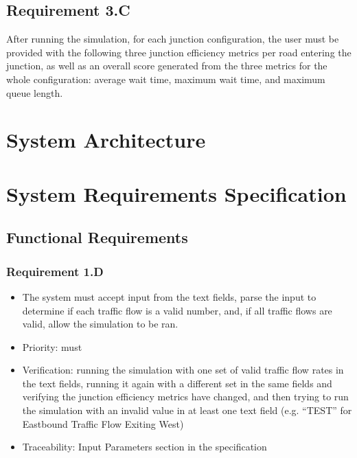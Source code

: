 \documentclass{article}
\begin{document}
\subsection{Requirement 3.C}
After running the simulation, for each junction configuration, 
the user must be provided with the following three junction efficiency metrics 
per road entering the junction, as well as an overall score generated from the 
three metrics for the whole configuration: average wait time, maximum wait time, 
and maximum queue length.

\section{System Architecture}

\section{System Requirements Specification}
\subsection{Functional Requirements}
\subsubsection{Requirement 1.D}
\begin{itemize}
  \item The system must accept input from the text fields, parse the input to 
  determine if each traffic flow is a valid number, and, if all traffic flows 
  are valid, allow the simulation to be ran.
  \item Priority: must
  \item Verification: running the simulation with one set of valid traffic 
  flow rates in the text fields, running it again with a different set in 
  the same fields and verifying the junction efficiency metrics have changed, 
  and then trying to run the simulation with an invalid value in at least one 
  text field (e.g. “TEST” for Eastbound Traffic Flow Exiting West)
  \item Traceability: Input Parameters section in the specification
\end{itemize}
\end{document}
